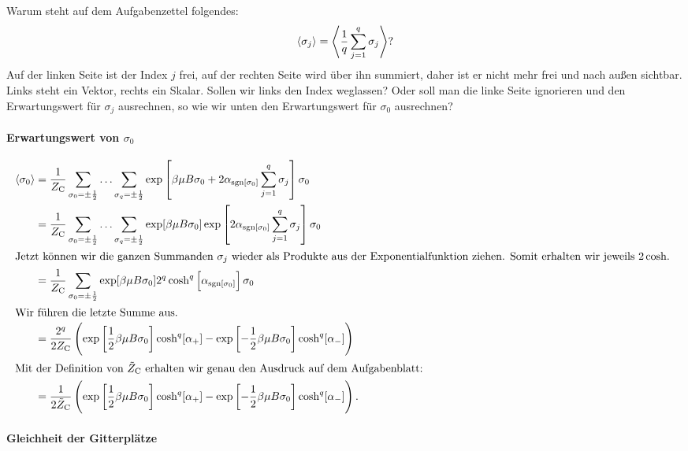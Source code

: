 Warum steht auf dem Aufgabenzettel folgendes:
\[
    \langle \sigma_j \rangle = \left\langle \frac 1q \sum_{j=1}^q \sigma_j \right\rangle ?
\]
Auf der linken Seite ist der Index $j$ frei, auf der rechten Seite wird über
ihn summiert, daher ist er nicht mehr frei und nach außen sichtbar. Links steht
ein Vektor, rechts ein Skalar. Sollen wir links den Index weglassen? Oder soll
man die linke Seite ignorieren und den Erwartungswert für $\sigma_j$
ausrechnen, so wie wir unten den Erwartungswert für $\sigma_0$ ausrechnen?

\fehlt

\paragraph{Erwartungswert von $\sigma_0$}

\begin{align*}
    \bracket{\sigma_0}
    &= \frac{1}{Z_\text C} \sum_{\sigma_0 = \pm\frac12} \ldots \sum_{\sigma_q = \pm\frac12}
    \exp\sbr{\beta \mu B \sigma_0 + 2 \alpha_{\sgn[\sigma_0]} \sum_{j=1}^q
    \sigma_j} \sigma_0 \\
    &= \frac{1}{Z_\text C} \sum_{\sigma_0 = \pm\frac12} \ldots \sum_{\sigma_q = \pm\frac12}
    \exp[\beta \mu B \sigma_0] 
    \exp\sbr{2 \alpha_{\sgn[\sigma_0]} \sum_{j=1}^q
    \sigma_j} \sigma_0 \\
    \intertext{%
        Jetzt können wir die ganzen Summanden $\sigma_j$ wieder als Produkte
        aus der Exponentialfunktion ziehen. Somit erhalten wir jeweils $2
        \cosh$.
    }
    &= \frac{1}{Z_\text C} \sum_{\sigma_0 = \pm\frac12}
    \exp[\beta \mu B \sigma_0] 
    2^q \cosh^q\sbr{\alpha_{\sgn[\sigma_0]}} \sigma_0 \\
    \intertext{%
        Wir führen die letzte Summe aus.
    }
    &= \frac{2^q}{2 Z_\text C} \del{
        \exp\sbr{\frac 12 \beta \mu B \sigma_0} \cosh^q[\alpha_+]
        - \exp\sbr{-\frac 12 \beta \mu B \sigma_0} \cosh^q[\alpha_-]
    } \\
    \intertext{%
        Mit der Definition von $\tilde Z_\text C$ erhalten wir genau den
        Ausdruck auf dem Aufgabenblatt:
    }
    &= \frac{1}{2 \tilde Z_\text C} \del{
        \exp\sbr{\frac 12 \beta \mu B \sigma_0} \cosh^q[\alpha_+]
        - \exp\sbr{-\frac 12 \beta \mu B \sigma_0} \cosh^q[\alpha_-]
    }.
\end{align*}


\paragraph{Gleichheit der Gitterplätze}

